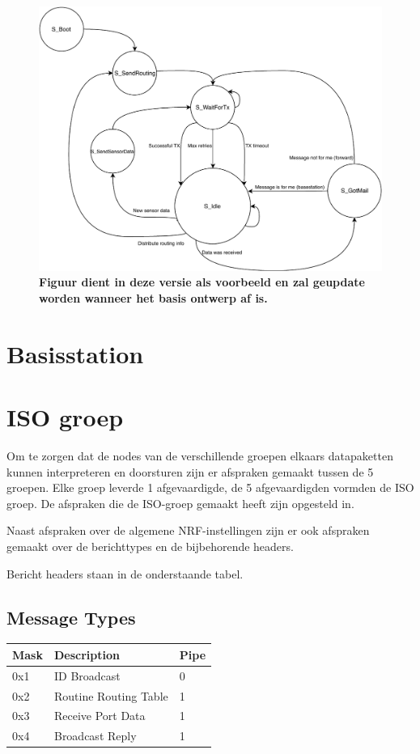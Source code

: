 \documentclass[a4paper, 11pt]{article}
\begin{document}
\begin{figure}[!ht]
	\includegraphics[width=.8\textwidth, keepaspectratio]{media/PState.pdf}
    \caption{ \textbf{Figuur dient in deze versie als voorbeeld en zal geupdate worden wanneer het basis ontwerp af is.}}
    \label{fig:Statemachine}
\end{figure}

\section{Basisstation}

\section{ISO groep}
Om te zorgen dat de nodes van de verschillende groepen elkaars datapaketten kunnen interpreteren en doorsturen zijn er afspraken gemaakt tussen de 5 groepen. Elke groep leverde 1 afgevaardigde, de 5 afgevaardigden vormden de ISO groep. De afspraken die de ISO-groep gemaakt heeft zijn opgesteld in\cite{ISO}. 

Naast afspraken over de algemene NRF-instellingen zijn er ook afspraken gemaakt over de berichttypes en de bijbehorende headers.

Bericht headers staan in de onderstaande tabel.
\newpage
\subsection*{Message Types}
\begin{center}
	\begin{table}[!ht]
		\begin{tabular}{|l|l|l|}
			\hline
			\rowcolor[HTML]{EFEFEF} 
			Mask & Description           & Pipe \\ \hline
			0x1  & ID Broadcast          & 0    \\ \hline
			0x2  & Routine Routing Table & 1    \\ \hline
			0x3  & Receive Port Data     & 1    \\ \hline
			0x4  & Broadcast Reply       & 1    \\ \hline
		\end{tabular}
	\end{table}
\end{center}
\end{document}
